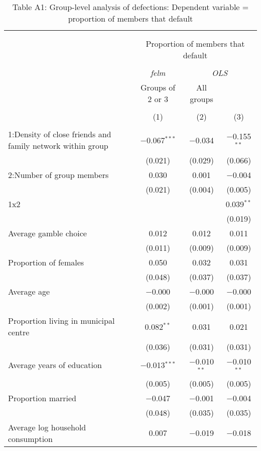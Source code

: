 \documentclass[]{elsarticle} %
\begin{document}
\begin{table}[!htbp] \centering 
  \caption{Table A1: Group-level analysis of defections: Dependent variable = proportion of members that default} 
  \label{} 
\scriptsize 
\begin{tabular}{@{\extracolsep{0.3pt}}lccc} 
\\[-1.8ex]\hline 
\hline \\[-1.8ex] 
\\[-1.8ex] & \multicolumn{3}{c}{Proportion of members that default} \\ 
\\[-1.8ex] & \textit{felm} & \multicolumn{2}{c}{\textit{OLS}} \\ 
 & Groups of 2 or 3 & All groups &  \\ 
\\[-1.8ex] & (1) & (2) & (3)\\ 
\hline \\[-1.8ex] 
 1:Density of close friends and family network within group & $-$0.067$^{***}$ & $-$0.034 & $-$0.155$^{**}$ \\ 
  & (0.021) & (0.029) & (0.066) \\ 
  2:Number of group members & 0.030 & 0.001 & $-$0.004 \\ 
  & (0.021) & (0.004) & (0.005) \\ 
  1x2 &  &  & 0.039$^{**}$ \\ 
  &  &  & (0.019) \\ 
  Average gamble choice & 0.012 & 0.012 & 0.011 \\ 
  & (0.011) & (0.009) & (0.009) \\ 
  Proportion of females & 0.050 & 0.032 & 0.031 \\ 
  & (0.048) & (0.037) & (0.037) \\ 
  Average age & $-$0.000 & $-$0.000 & $-$0.000 \\ 
  & (0.002) & (0.001) & (0.001) \\ 
  Proportion living in municipal centre & 0.082$^{**}$ & 0.031 & 0.021 \\ 
  & (0.036) & (0.031) & (0.031) \\ 
  Average years of education & $-$0.013$^{***}$ & $-$0.010$^{**}$ & $-$0.010$^{**}$ \\ 
  & (0.005) & (0.005) & (0.005) \\ 
  Proportion married & $-$0.047 & $-$0.001 & $-$0.004 \\ 
  & (0.048) & (0.035) & (0.035) \\ 
  Average log household consumption & 0.007 & $-$0.019 & $-$0.018 \\ 

\end{tabular}
\end{table}
\end{document}
